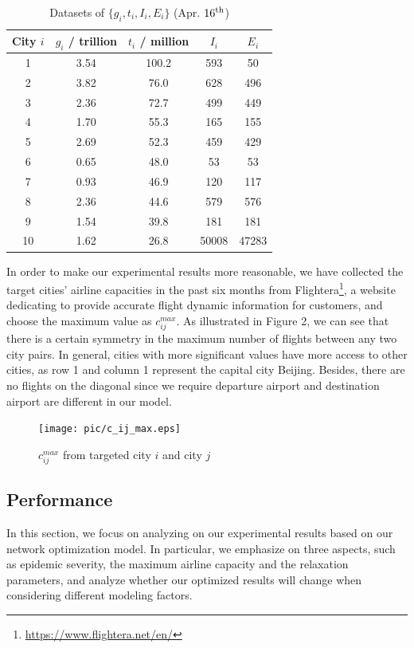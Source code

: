 \begin{spacing}{2}
\begin{table}[H]
    \centering
    \caption{Datasets of $\{g_i, t_i, I_i, E_i\}$ (Apr. $16^{\rm th}$)}
    \setlength{\tabcolsep}{5pt}
    \begin{tabular}{c|c|c|c|c}
        \toprule
         City $i$ & $g_i$ / trillion & $t_i$ / million & $I_i$ & $E_i$ \\
         \toprule
         1 & 3.54 & 100.2 & 593  & 50 \\
         2 & 3.82 & 76.0 & 628 & 496 \\
         3 & 2.36 & 72.7 & 499 & 449 \\
         4 & 1.70 & 55.3 & 165 & 155 \\
         5 & 2.69 & 52.3 & 459 & 429 \\
         6 & 0.65 & 48.0 & 53 & 53 \\
         7 & 0.93 & 46.9 & 120 & 117 \\
         8 & 2.36 & 44.6 & 579 & 576 \\
         9 & 1.54 & 39.8 & 181 & 181 \\
         10 & 1.62 & 26.8 & 50008 & 47283 \\
        \bottomrule
    \end{tabular}
    \label{table2}
\end{table}
\end{spacing}
In order to make our experimental results more reasonable, we have collected
the target cities' airline capacities in the past six months from Flightera\footnote{\url{https://www.flightera.net/en/}}, a website dedicating to provide accurate flight dynamic information for customers, and choose the maximum value as $c_{ij}^{max}$. As illustrated in Figure 2, we can see that there is a certain symmetry in the maximum number of flights between any two city pairs. In general, cities with more significant values have more access to other cities, as row 1 and column 1 represent the capital city Beijing. Besides, there are no flights on the diagonal since we require departure airport and destination airport are different in our model.


\begin{figure}[H]
    \centering
    \texttt{[image: pic/c\_ij\_max.eps]}
    \caption{$c_{ij}^{max}$ from targeted city $i$ and city $j$}
    \label{fig:my_label}
\end{figure}


\subsection{Performance}
In this section, we focus on analyzing on our experimental results based on our network optimization model. In particular, we emphasize on three aspects, such as epidemic severity, the maximum airline capacity and the relaxation parameters, and analyze whether our optimized results will change when considering different modeling factors. 
